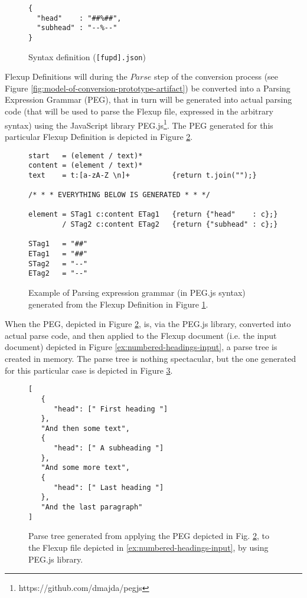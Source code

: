 \documentclass{scrreprt}
\begin{document}
\begin{figure}[h]
\begin{lstlisting}
{
  "head"    : "##%##",
  "subhead" : "--%--"
}
\end{lstlisting}
\caption{Syntax definition (\texttt{[fupd].json})}
\label{ex:numbered-headings-fupd}
\end{figure}

Flexup Definitions will during the $Parse$ step of the conversion process (see Figure \ref{fig:model-of-conversion-prototype-artifact}) be converted into a Parsing Expression Grammar (PEG), that in turn will be generated into actual parsing code (that will be used to parse the Flexup file, expressed in the arbitrary syntax) using the JavaScript library PEG.js\footnote{ https://github.com/dmajda/pegjs}. The PEG generated for this particular Flexup Definition is depicted in Figure \ref{ex:peg-grammar}.


\begin{figure}[h]
\centering
\begin{lstlisting}
start   = (element / text)*
content = (element / text)*
text    = t:[a-zA-Z \n]+          {return t.join("");}

/* * * EVERYTHING BELOW IS GENERATED * * */

element = STag1 c:content ETag1   {return {"head"    : c};}
        / STag2 c:content ETag2   {return {"subhead" : c};}

STag1   = "##"
ETag1   = "##"
STag2   = "--"
ETag2   = "--"
\end{lstlisting}
\caption{Example of Parsing expression grammar (in PEG.js syntax) generated from the Flexup Definition in Figure \ref{ex:numbered-headings-fupd}.}
\label{ex:peg-grammar}
\end{figure}

When the PEG, depicted in Figure \ref{ex:peg-grammar}, is, via the PEG.js library, converted into actual parse code, and then applied to the Flexup document (i.e. the input document) depicted in Figure \ref{ex:numbered-headings-input}, a parse tree is created in memory. The parse tree is nothing spectacular, but the one generated for this particular case is depicted in Figure \ref{ex:generated-parse-tree}.

\begin{figure}[h]
\begin{lstlisting}
[
   {
      "head": [" First heading "]
   },
   "And then some text",
   {
      "head": [" A subheading "]
   },
   "And some more text",
   {
      "head": [" Last heading "]
   },
   "And the last paragraph"
]
\end{lstlisting}
\caption{Parse tree generated from applying the PEG depicted in Fig. \ref{ex:peg-grammar}, to the Flexup file depicted in \ref{ex:numbered-headings-input}, by using PEG.js library.}
\label{ex:generated-parse-tree}
\end{figure}
\end{document}
